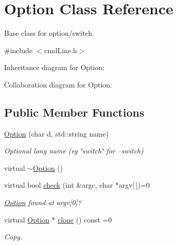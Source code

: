 \hypertarget{classOption}{}\section{Option Class Reference}
\label{classOption}


Base class for option/switch.  




{\ttfamily \#include $<$cmd\+Line.\+h$>$}



Inheritance diagram for Option\+:


Collaboration diagram for Option\+:
\subsection*{Public Member Functions}
\begin{DoxyCompactItemize}
\item 
\hyperlink{classOption_a4a99a0e80b5b9f1f684fb844ae92a85c}{Option} (char d, std\+::string name)
\begin{DoxyCompactList}\small\item\em Optional long name (eg \char`\"{}switch\char`\"{} for --switch) \end{DoxyCompactList}\item 
virtual \hyperlink{classOption_a51319077627d44640d65010abc14b3c9}{$\sim$\+Option} ()
\item 
virtual bool \hyperlink{classOption_a4bb9b2803454fb8cb4e51eeebb7eccd0}{check} (int \&argc, char $\ast$argv\mbox{[}$\,$\mbox{]})=0
\begin{DoxyCompactList}\small\item\em \hyperlink{classOption}{Option} found at argv\mbox{[}0\mbox{]}? \end{DoxyCompactList}\item 
virtual \hyperlink{classOption}{Option} $\ast$ \hyperlink{classOption_a38cd76e168098aa9dee95a711a843d61}{clone} () const =0
\begin{DoxyCompactList}\small\item\em Copy. \end{DoxyCompactList}\end{DoxyCompactItemize}
